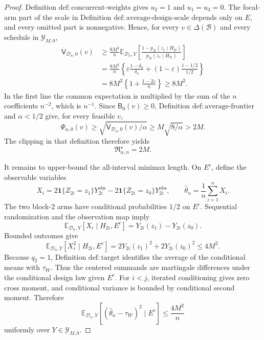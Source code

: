 \documentclass{article}
\begin{document}
\begin{proof}
Definition \(\mathrm{def:concurrent\text{-}weights}\) gives \(u_2=1\) and \(u_1=u_3=0\).  The focal-arm part of the scale in Definition \(\mathrm{def:average\text{-}design\text{-}scale}\) depends only on \(E\), and every omitted part is nonnegative.  Hence, for every \(v\in\Delta(\mathcal B)\) and every schedule in \(\mathcal Y_{M,0}\),
\[
\begin{aligned}
 \overline{\mathsf V}_{\mathcal D_n,0}(v)
 &\ge
 \frac{8M^2}{n}
 \mathbb E_{\mathcal D_n,Y}
 \left[
  \frac{1-p_{2i}(z_1\mid H_{2i})}
       {p_{2i}(z_1\mid H_{2i})}
 \right]\\
 &=\frac{8M^2}{n}
 \left\{
  \varepsilon\frac{1-\delta_n}{\delta_n}
  +(1-\varepsilon)\frac{1-1/2}{1/2}
 \right\}\\
 &=8M^2\left\{1+\frac{1-2\varepsilon}{n}\right\}
 \ge8M^2.
\end{aligned}
\]
In the first line the common expectation is multiplied by the sum of the \(n\) coefficients \(n^{-2}\), which is \(n^{-1}\).  Since \(\mathsf B_0(v)\ge0\), Definition \(\mathrm{def:average\text{-}frontier}\) and \(\alpha<1/2\) give, for every feasible \(v\),
\[
 \Psi_{\alpha,0}(v)
 \ge\sqrt{\overline{\mathsf V}_{\mathcal D_n,0}(v)/\alpha}
 \ge M\sqrt{8/\alpha}>2M.
\]
The clipping in that definition therefore yields
\[
 \mathfrak R_{\alpha,n}^\star=2M.
\]

It remains to upper-bound the all-interval minimax length.  On \(E^c\), define the observable variables
\[
 X_i=2\mathbf 1\{Z_{2i}=z_1\}Y^{\mathrm{obs}}_{2i}
     -2\mathbf 1\{Z_{2i}=z_0\}Y^{\mathrm{obs}}_{2i},
 \qquad
 \widehat\theta_n=\frac1n\sum_{i=1}^n X_i.
\]
The two block-\(2\) arms have conditional probabilities \(1/2\) on \(E^c\).  Sequential randomization and the observation map imply
\[
 \mathbb E_{\mathcal D_n,Y}[X_i\mid H_{2i},E^c]
 =Y_{2i}(z_1)-Y_{2i}(z_0).
\]
Bounded outcomes give
\[
 \mathbb E_{\mathcal D_n,Y}[X_i^2\mid H_{2i},E^c]
 =2Y_{2i}(z_1)^2+2Y_{2i}(z_0)^2
 \le4M^2.
\]
Because \(q_2=1\), Definition \(\mathrm{def:target}\) identifies the average of the conditional means with \(\tau_W\).  Thus the centered summands are martingale differences under the conditional design law given \(E^c\).  For \(i<j\), iterated conditioning gives zero cross moment, and conditional variance is bounded by conditional second moment.  Therefore
\[
 \mathbb E_{\mathcal D_n,Y}
 \left[(\widehat\theta_n-\tau_W)^2\mid E^c\right]
 \le\frac{4M^2}{n}
\]
uniformly over \(Y\in\mathcal Y_{M,0}\).


\end{proof}
\end{document}
